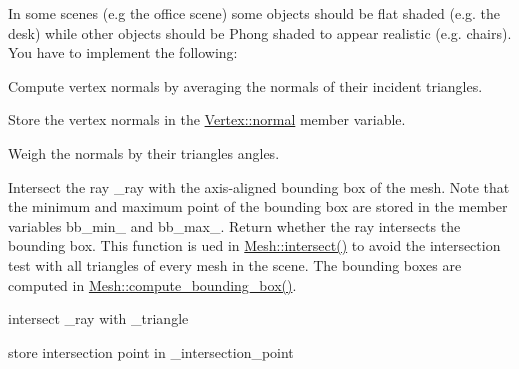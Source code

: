
\begin{DoxyRefList}
\item[\label{todo__todo000001}%
\hypertarget{todo__todo000001}{}%
Member \hyperlink{classMesh_a4e9bedfc415b7135c9587f63535fcb6d}{Mesh\+:\+:compute\+\_\+normals} ()]In some scenes (e.\+g the office scene) some objects should be flat shaded (e.\+g. the desk) while other objects should be Phong shaded to appear realistic (e.\+g. chairs). You have to implement the following\+:
\begin{DoxyItemize}
\item Compute vertex normals by averaging the normals of their incident triangles.
\item Store the vertex normals in the \hyperlink{structMesh_1_1Vertex_adf43225146648954d9196e4b6fa47379}{Vertex\+::normal} member variable.
\item Weigh the normals by their triangles\textquotesingle{} angles.  
\end{DoxyItemize}
\item[\label{todo__todo000002}%
\hypertarget{todo__todo000002}{}%
Member \hyperlink{classMesh_a5839749bb09a6bf09c56056016cc11b2}{Mesh\+:\+:intersect\+\_\+bounding\+\_\+box} (const \hyperlink{classRay}{Ray} \&\+\_\+ray) const ]Intersect the ray {\ttfamily \+\_\+ray} with the axis-\/aligned bounding box of the mesh. Note that the minimum and maximum point of the bounding box are stored in the member variables {\ttfamily bb\+\_\+min\+\_\+} and {\ttfamily bb\+\_\+max\+\_\+}. Return whether the ray intersects the bounding box. This function is ued in {\ttfamily \hyperlink{classMesh_a3d982c37d43eb5d3929b2de2b263d662}{Mesh\+::intersect()}} to avoid the intersection test with all triangles of every mesh in the scene. The bounding boxes are computed in {\ttfamily \hyperlink{classMesh_a303c102fd254ea32b366591aa00f6e8e}{Mesh\+::compute\+\_\+bounding\+\_\+box()}}.  
\item[\label{todo__todo000003}%
\hypertarget{todo__todo000003}{}%
Member \hyperlink{classMesh_a9be7264791ff3de7dbf99f8548fb7725}{Mesh\+:\+:intersect\+\_\+triangle} (const \hyperlink{structMesh_1_1Triangle}{Triangle} \&\+\_\+triangle, const \hyperlink{classRay}{Ray} \&\+\_\+ray, \hyperlink{classvec3}{vec3} \&\+\_\+intersection\+\_\+point, \hyperlink{classvec3}{vec3} \&\+\_\+intersection\+\_\+normal, double \&\+\_\+intersection\+\_\+t) const ]
\begin{DoxyItemize}
\item intersect \+\_\+ray with \+\_\+triangle
\item store intersection point in {\ttfamily \+\_\+intersection\+\_\+point}

\end{DoxyItemize}
\end{DoxyRefList}
